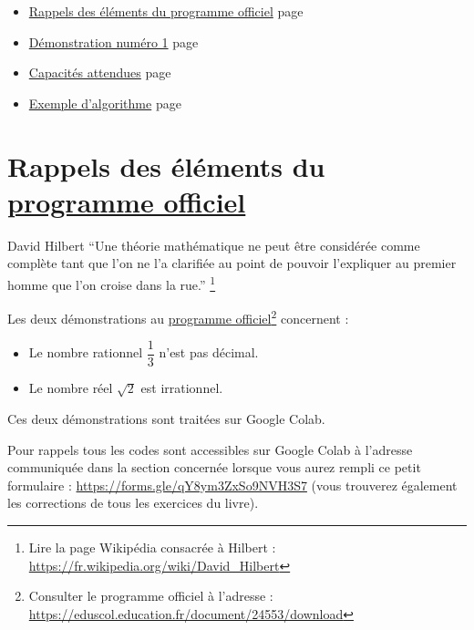 \documentclass[a4paper,11pt]{book}
\begin{document}
\clearpage

\label{orgc52e956}
\label{page:proofs-menu}
\begin{itemize}
\item \hyperref[org3f97a9b]{Rappels des éléments du programme officiel} page \pageref{page:sec4.1review}
\item \hyperref[org6413964]{Démonstration numéro 1} page \pageref{page:sec4.2proof1}
\item \hyperref[org9c65356]{Capacités attendues} page \pageref{page:sec3capacities}
\item \hyperref[org091b4be]{Exemple d'algorithme} page \pageref{page:sec5algo}
\end{itemize}

\clearpage

\chapter{Rappels des éléments du \href{https://eduscol.education.fr/document/24553/download}{programme officiel}}
\label{sec:orgb9fafca}
\label{org3f97a9b}
\label{page:sec4.1review}




\begin{myquote}{David Hilbert}
\enquote{Une théorie mathématique ne peut être considérée comme complète
tant que l'on ne l'a clarifiée au point de pouvoir l'expliquer au
premier homme que l'on croise dans la rue.}
\footnote{Lire la page Wikipédia consacrée à Hilbert : \url{https://fr.wikipedia.org/wiki/David_Hilbert}}
\end{myquote}



\clearpage

Les deux démonstrations au \href{https://eduscol.education.fr/document/24553/download}{programme officiel}\footnote{Consulter le programme officiel à l'adresse :
\url{https://eduscol.education.fr/document/24553/download}} concernent :

\begin{itemize}
\item Le nombre rationnel \(\dfrac{1}{3}\) n'est pas décimal.
\item Le nombre réel \(\sqrt{2}\) est irrationnel.
\end{itemize}

Ces deux démonstrations sont traitées sur Google Colab.

Pour rappels tous les codes sont accessibles sur Google Colab à
l'adresse communiquée dans la section concernée lorsque vous
aurez rempli ce petit formulaire : \url{https://forms.gle/qY8ym3ZxSo9NVH3S7}
(vous trouverez également les corrections de tous les exercices du
livre).
\end{document}
